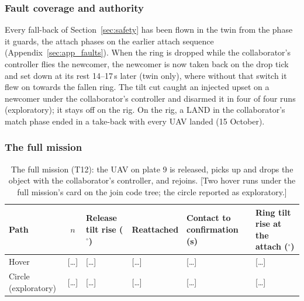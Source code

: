 
\subsubsection{Fault coverage and authority}
\label{sec:res_join_faults}

Every fall-back of Section~\ref{sec:safety} has been flown in the twin from the phase it guards, the attach
phases on the earlier attach sequence (Appendix~\ref{sec:app_faults}). When the ring is dropped while the collaborator's controller flies the
newcomer, the newcomer is now taken back on the drop tick and set down at its rest 14--17\,s later (twin only), where
without that switch it flew on towards the fallen ring. The tilt cut caught an
injected upset on a newcomer under the collaborator's controller and disarmed it in four of four runs (exploratory);
it stays off on the rig. On the rig, a LAND in the collaborator's match phase ended in a take-back with every UAV
landed (15 October).

\subsubsection{The full mission}

\begin{table}[htbp]
  \centering
  \footnotesize
  \caption[The full mission]{The full mission (T12): the UAV on plate 9 is released, picks up and drops the object
  with the collaborator's controller, and rejoins. [Two hover runs under the full mission's card on the join code
  tree; the circle reported as exploratory.]}
  \label{tab:T12}
  \begin{tabularx}{\textwidth}{lcYYYY}
    \toprule
    Path & $n$ & Release tilt rise ($^\circ$) & Reattached & Contact to confirmation (s) & Ring tilt rise at the attach ($^\circ$) \\
    \midrule
    Hover & [\dots] & [\dots] & [\dots] & [\dots] & [\dots] \\
    Circle (exploratory) & [\dots] & [\dots] & [\dots] & [\dots] & [\dots] \\
    \bottomrule
  \end{tabularx}
\end{table}

